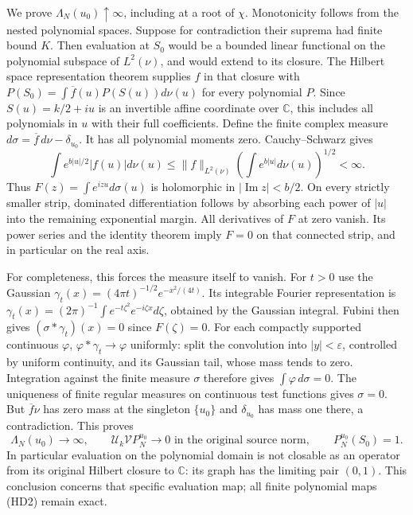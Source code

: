 We prove $\Lambda_N(u_0)\uparrow\infty$, including at a root of $\chi$.
Monotonicity follows from the nested polynomial spaces. Suppose for
contradiction their suprema had finite bound $K$. Then evaluation at
$S_0$ would be a bounded linear functional on the polynomial subspace
of $L^2(\nu)$, and would extend to its closure. The Hilbert space
representation theorem supplies $f$ in that closure with
$P(S_0)=\int\overline f(u)P(S(u))d\nu(u)$ for every polynomial $P$.
Since $S(u)=k/2+iu$ is an invertible affine coordinate over $\mathbb C$,
this includes all polynomials in $u$ with their full coefficients.
Define the finite complex measure
$d\sigma=\overline f\,d\nu-\delta_{u_0}$.
It has all polynomial moments zero. Cauchy--Schwarz gives
\[
 \int e^{b|u|/2}|f(u)|d\nu(u)
 \le\|f\|_{L^2(\nu)}
       \left(\int e^{b|u|}d\nu(u)\right)^{1/2}<\infty.
 \tag{HD4}
\]
Thus $F(z)=\int e^{izu}d\sigma(u)$ is holomorphic in
$|\operatorname{Im}z|<b/2$. On every strictly smaller strip,
dominated differentiation follows by absorbing each power of $|u|$
into the remaining exponential margin. All derivatives of $F$ at zero
vanish. Its power series and the identity theorem imply $F=0$ on
that connected strip, and in particular on the real axis.

For completeness, this forces the measure itself to vanish. For $t>0$
use the Gaussian $\gamma_t(x)=(4\pi t)^{-1/2}e^{-x^2/(4t)}$.
Its integrable Fourier representation is
$\gamma_t(x)=(2\pi)^{-1}\int e^{-t\zeta^2}e^{-i\zeta x}d\zeta$,
obtained by the Gaussian integral. Fubini then gives
$(\sigma*\gamma_t)(x)=0$ since $F(\zeta)=0$.
For each compactly supported continuous $\varphi$,
$\varphi*\gamma_t\to\varphi$ uniformly: split the convolution
into $|y|<\varepsilon$, controlled by uniform continuity, and its
Gaussian tail, whose mass tends to zero. Integration against the
finite measure $\sigma$ therefore gives $\int\varphi\,d\sigma=0$.
The uniqueness of finite regular measures on continuous test functions
gives $\sigma=0$. But $\overline f\nu$ has zero mass at the singleton
$\{u_0\}$ and $\delta_{u_0}$ has mass one there, a contradiction.
This proves
\[
 \Lambda_N(u_0)\longrightarrow\infty,
 \qquad \mathcal U_k\mathcal V P_N^{u_0}\longrightarrow0
       \text{ in the original source norm},\qquad
 P_N^{u_0}(S_0)=1 .
 \tag{HD5}
\]
In particular evaluation on the polynomial domain is not closable as
an operator from its original Hilbert closure to $\mathbb C$: its
graph has the limiting pair $(0,1)$. This conclusion concerns that
specific evaluation map; all finite polynomial maps (HD2) remain exact.

